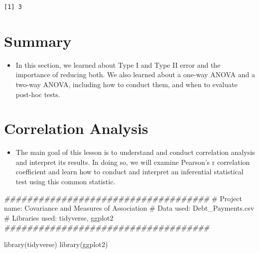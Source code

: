 \documentclass[
  letterpaper,
  DIV=11,
  numbers=noendperiod]{scrreprt}
\newenvironment{Shaded}{\begin{snugshade}}{\end{snugshade}}
\newcommand{\CommentTok}[1]{\textcolor[rgb]{0.37,0.37,0.37}{#1}}
\newcommand{\DocumentationTok}[1]{\textcolor[rgb]{0.37,0.37,0.37}{\textit{#1}}}
\newcommand{\FunctionTok}[1]{\textcolor[rgb]{0.28,0.35,0.67}{#1}}
\newcommand{\NormalTok}[1]{\textcolor[rgb]{0.00,0.23,0.31}{#1}}
\providecommand{\tightlist}{%
  \setlength{\itemsep}{0pt}\setlength{\parskip}{0pt}}\usepackage{longtable,booktabs,array}
\begin{document}
\begin{verbatim}
[1] 3
\end{verbatim}


\chapter{Summary}\label{summary-8}

\begin{itemize}
\tightlist
\item
  In this section, we learned about Type I and Type II error and the
  importance of reducing both. We also learned about a one-way ANOVA and
  a two-way ANOVA, including how to conduct them, and when to evaluate
  post-hoc tests.
\end{itemize}


\chapter{Correlation Analysis}\label{correlation-analysis}

\begin{itemize}
\tightlist
\item
  The main goal of this lesson is to understand and conduct correlation
  analysis and interpret its results. In doing so, we will examine
  Pearson's r correlation coefficient and learn how to conduct and
  interpret an inferential statistical test using this common statistic.
\end{itemize}

\begin{Shaded}
\begin{Highlighting}[]
\DocumentationTok{\#\#\#\#\#\#\#\#\#\#\#\#\#\#\#\#\#\#\#\#\#\#\#\#\#\#\#\#\#\#\#\#\#\#\#\#}
\CommentTok{\# Project name: Covariance and Measures of Association}
\CommentTok{\# Data used: Debt\_Payments.csv}
\CommentTok{\# Libraries used: tidyverse, ggplot2}
\DocumentationTok{\#\#\#\#\#\#\#\#\#\#\#\#\#\#\#\#\#\#\#\#\#\#\#\#\#\#\#\#\#\#\#\#\#\#\#\#}
\end{Highlighting}
\end{Shaded}

\begin{Shaded}
\begin{Highlighting}[]
\FunctionTok{library}\NormalTok{(tidyverse)}
\FunctionTok{library}\NormalTok{(ggplot2)}
\end{Highlighting}
\end{Shaded}
\end{document}
